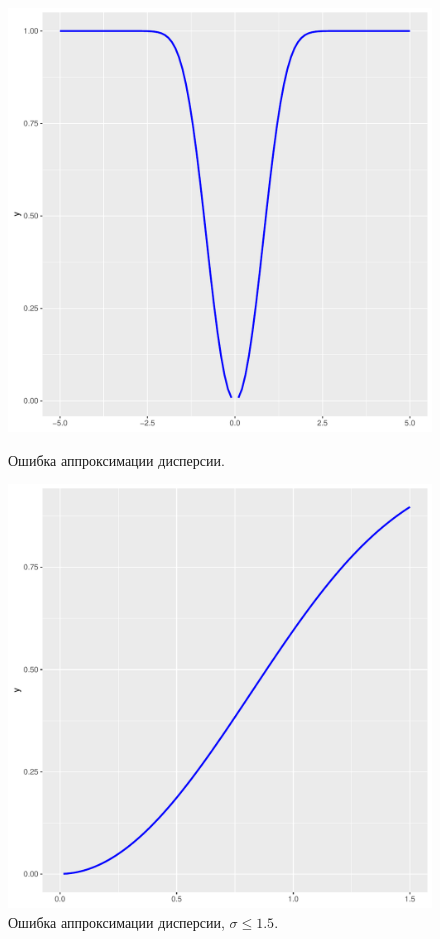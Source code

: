 \documentclass[12pt]{article}
\begin{document}
\begin{figure}[h]
	\begin{center}
		\begin{minipage}[h]{0.4\linewidth}
			\includegraphics[width=1\linewidth]{ris2.pdf}
			\caption{Ошибка аппроксимации дисперсии.} %
			\label{ris3} %
		\end{minipage}
		\hfill
		\begin{minipage}[h]{0.4\linewidth}
			\includegraphics[width=1\linewidth]{ris3.pdf}
			\caption{Ошибка аппроксимации дисперсии, $\sigma\leq 1.5.$}
			\label{ris4}
		\end{minipage}
	\end{center}
\end{figure}
	
\end{document}
